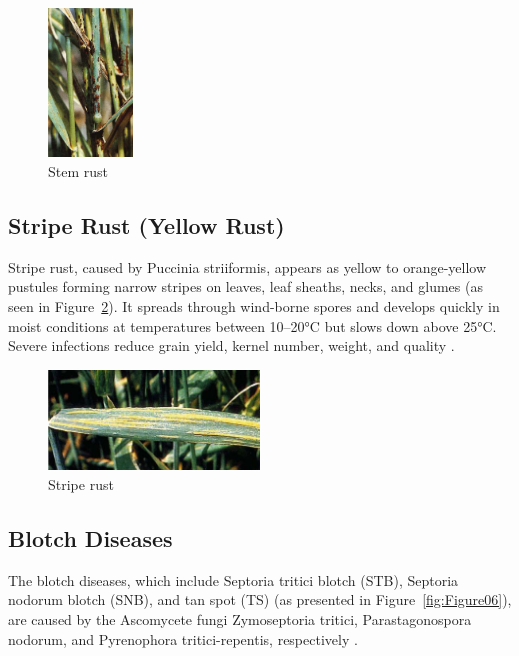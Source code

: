 \begin{figure}[H]
    \centering
    \includegraphics[width=0.2\textwidth]{chapters/chapter2/images/Figure04.png}
    \caption{Stem rust \protect\parencite{duveiller2012wheat}}
    \label{fig:Figure04}
\end{figure}

\subsection{Stripe Rust (Yellow Rust)}
 Stripe rust, caused by Puccinia striiformis, appears as yellow to orange-yellow pustules forming narrow stripes on leaves, leaf sheaths, necks, and glumes (as seen in Figure~\ref{fig:Figure05}). It spreads through wind-borne spores and develops quickly in moist conditions at temperatures between 10–20°C but slows down above 25°C. Severe infections reduce grain yield, kernel number, weight, and quality \parencite{duveiller2012wheat}.


\begin{figure}[H]
    \centering
    \includegraphics[width=0.5\textwidth]{chapters/chapter2/images/Figure05.png}
    \caption{Stripe rust \protect\parencite{duveiller2012wheat}}
    \label{fig:Figure05}
\end{figure}

\subsection{Blotch Diseases} 
The blotch diseases, which include Septoria tritici blotch (STB), Septoria nodorum blotch (SNB), and tan spot (TS) (as presented in Figure~\ref{fig:Figure06}), are caused by the Ascomycete fungi Zymoseptoria tritici, Parastagonospora nodorum, and Pyrenophora tritici-repentis, respectively \parencite{figueroa2018review}.


